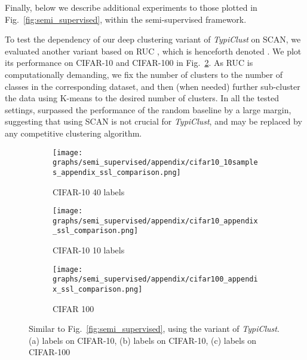 \documentclass{article}
\begin{document}
Finally, below we describe additional experiments to those plotted in Fig.~\ref{fig:semi_supervised}, within the semi-supervised framework.

To test the dependency of our deep clustering variant of \emph{TypiClust} on SCAN, we evaluated another variant based on RUC \citep{park2021improving}, which is henceforth denoted . We plot its performance on CIFAR-10 and CIFAR-100 in Fig.~\ref{fig:app:semi_supervised}. As RUC is computationally demanding, we fix the number of clusters to the number of classes in the corresponding dataset, and then (when needed) further sub-cluster the data using K-means to the desired number of clusters. In all the tested settings,  surpassed the performance of the random baseline by a large margin, suggesting that using SCAN is not crucial for \emph{TypiClust}, and may be replaced by any competitive clustering algorithm.


\begin{figure}[htb!]
\begin{center}
    \begin{subfigure}{.2\textwidth}
      \centering
      \texttt{[image: graphs/semi\_supervised/appendix/cifar10\_10samples\_appendix\_ssl\_comparison.png]}
    \vspace{-0.75cm}
    \caption{CIFAR-10 40 labels}
    \label{fig:app:ssl_cifar_10_with_40_examples}
    \end{subfigure}
    \begin{subfigure}{.2\textwidth}
      \centering
      \texttt{[image: graphs/semi\_supervised/appendix/cifar10\_appendix\_ssl\_comparison.png]}
    \vspace{-0.75cm}
    \caption{CIFAR-10 10 labels}
\end{subfigure}
    \begin{subfigure}{.2\textwidth}
      \centering
      \texttt{[image: graphs/semi\_supervised/appendix/cifar100\_appendix\_ssl\_comparison.png]}
    \vspace{-0.75cm}
    \caption{CIFAR 100}
\end{subfigure}
\caption{Similar to Fig.~\ref{fig:semi_supervised}, using the  variant of \emph{TypiClust}. (a)  labels on CIFAR-10, (b)  labels on CIFAR-10, (c)  labels on CIFAR-100}
\label{fig:app:semi_supervised}
\vspace{-0.3cm}
\end{center}
\end{figure}
\end{document}
